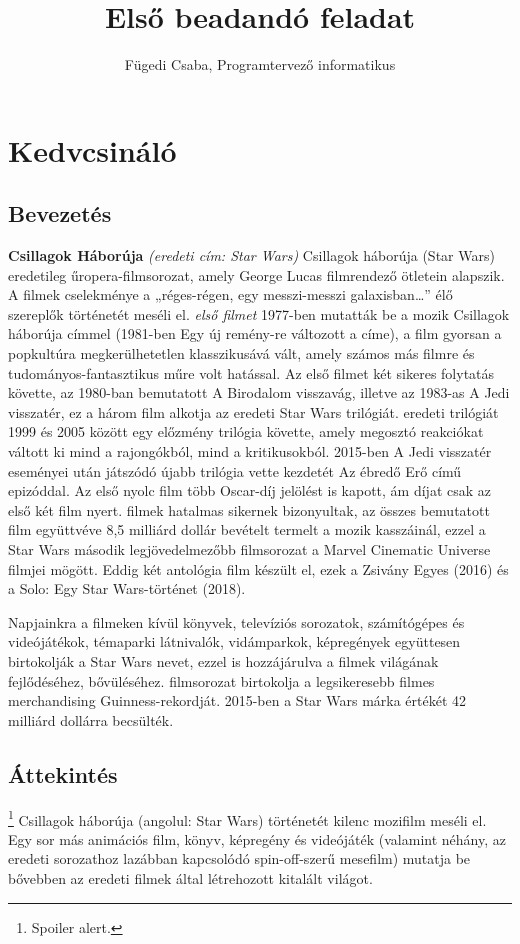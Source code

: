 \documentclass[a4paper,12pt,twoside]{report}
\theoremstyle{definition}
\begin{document}
	\title{Első beadandó feladat}
	\author{Fügedi Csaba, Programtervező informatikus}
	\maketitle
	\tableofcontents
	\chapter{Kedvcsináló}
	\section{Bevezetés}
	\textbf{Csillagok Háborúja} \textit{(eredeti cím: Star Wars)} \Az Csillagok háborúja (Star Wars) eredetileg űropera-filmsorozat, amely George Lucas filmrendező ötletein alapszik. A filmek cselekménye a „réges-régen, egy messzi-messzi galaxisban…” élő szereplők történetét meséli el. 
	\textit{\Az első filmet} 1977-ben mutatták be a mozik Csillagok háborúja címmel (1981-ben Egy új remény-re változott a címe), a film gyorsan a popkultúra megkerülhetetlen klasszikusává vált, amely számos más filmre és tudományos-fantasztikus műre volt hatással. Az első filmet két sikeres folytatás követte, az 1980-ban bemutatott A Birodalom visszavág, illetve az 1983-as A Jedi visszatér, ez a három film alkotja az eredeti Star Wars trilógiát. \Az eredeti trilógiát 1999 és 2005 között egy előzmény trilógia követte, amely megosztó reakciókat váltott ki mind a rajongókból, mind a kritikusokból. 2015-ben A Jedi visszatér eseményei után játszódó újabb trilógia vette kezdetét Az ébredő Erő című epizóddal. Az első nyolc film több Oscar-díj jelölést is kapott, ám díjat csak az első két film nyert. \Az filmek hatalmas sikernek bizonyultak, az összes bemutatott film együttvéve 8,5 milliárd dollár bevételt termelt a mozik kasszáinál, ezzel a Star Wars második legjövedelmezőbb filmsorozat a Marvel Cinematic Universe filmjei mögött. Eddig két antológia film készült el, ezek a Zsivány Egyes (2016) és a Solo: Egy Star Wars-történet (2018).
	
	Napjainkra a filmeken kívül könyvek, televíziós sorozatok, számítógépes és videójátékok, témaparki látnivalók, vidámparkok, képregények együttesen birtokolják a Star Wars nevet, ezzel is hozzájárulva a filmek világának fejlődéséhez, bővüléséhez. \Az filmsorozat birtokolja a legsikeresebb filmes merchandising Guinness-rekordját. 2015-ben a Star Wars márka értékét 42 milliárd dollárra becsülték.
	
	\section{Áttekintés}\footnote{Spoiler alert.}
	\Az Csillagok háborúja (angolul: Star Wars) történetét kilenc mozifilm meséli el. Egy sor más animációs film, könyv, képregény és videójáték (valamint néhány, az eredeti sorozathoz lazábban kapcsolódó spin-off-szerű mesefilm) mutatja be bővebben az eredeti filmek által létrehozott kitalált világot.
	
\end{document}
